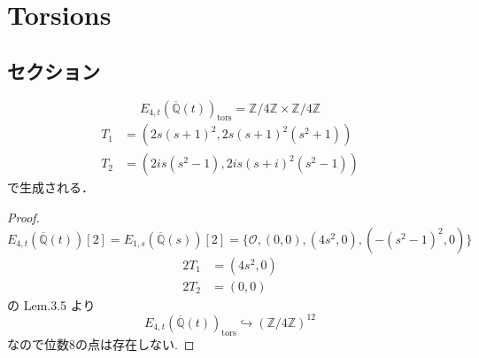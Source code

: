 \documentclass[main]{subfiles}
\begin{document}
\chapter{Torsions}

\section{セクション}

\begin{thm}
    \begin{equation}
        E_{4,t}(\overline{\mathbb{Q}}(t))_ \text{tors} = \mathbb{Z} / 4 \mathbb{Z} \times \mathbb{Z} / 4 \mathbb{Z}
    \end{equation}
    \begin{align}
        T_1 & = (2s(s+1)^2,2s(s+1)^2(s^2+1))   \\
        T_2 & = (2is(s^2-1),2is(s+i)^2(s^2-1))
    \end{align}
    で生成される．
\end{thm}
\begin{proof}
    \begin{equation}
        E_{4,t}(\overline{\mathbb{Q}}(t))[2] = E_{1,s}(\overline{\mathbb{Q}}(s))[2] = \{\mathcal{O}, (0,0), (4s^{2},0),( - (s^{2} - 1)^{2},0)\}
    \end{equation}
    \begin{align}
        2T_1 & = (4s^2,0) \\
        2T_2 & = (0,0)
    \end{align}
    \cite{ref:naskrecki2013} の Lem.3.5 より
    \begin{equation}
        E_{4,t}(\overline{\mathbb{Q}}(t))_ \text{tors} \hookrightarrow (\mathbb{Z} / 4 \mathbb{Z})^{12}
    \end{equation}
    なので位数8の点は存在しない.
\end{proof}
\end{document}
